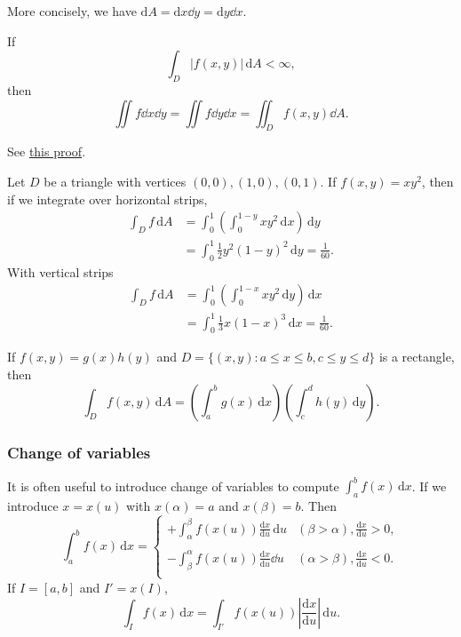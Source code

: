 More concisely, we have $ \mathrm{d} A = \mathrm{d} x\dd y=\mathrm{d} y\dd x $.
\begin{theorem}\label{thm:Fubini's theorem}
    If
    \[
        \int_{D} \left| f(x,y) \right| \,\mathrm{d}A<\infty,
    \]
    then 
    \[
        \iint f\dd x\dd y = \iint f\dd y\dd x = \iint_{D}f(x,y)\dd A.
    \]
\end{theorem}
See \href{https://dec41.user.srcf.net/notes/II_M/probability_and_measure.pdf\#page=50}{this proof}.

\begin{example}
    Let $D$ be a triangle with vertices $(0,0),(1,0),(0,1)$. If $f(x,y)=xy^2$, then if we integrate over horizontal strips,
    \begin{align*}
        \int_{D} f \,\mathrm{d}A &= \int_{0}^{1} \left( \int_{0}^{1-y} xy^2 \,\mathrm{d}x \right) \,\mathrm{d}y\\ 
        &= \int_{0}^{1} \frac{1}{2}y^2(1-y)^2 \,\mathrm{d}y = \frac{1}{60}.
    \end{align*}
    With vertical strips 
    \begin{align*}
        \int_{D} f \,\mathrm{d}A &= \int_{0}^{1} \left( \int_{0}^{1-x} xy^2 \,\mathrm{d}y \right) \,\mathrm{d}x\\ 
        &= \int_{0}^{1} \frac{1}{3}x(1-x)^3 \,\mathrm{d}x = \frac{1}{60}.
    \end{align*}
\end{example}

\begin{proposition}
    If $f(x,y)=g(x)h(y)$ and $ D=\{(x,y):a\le x\le b,c\le y\le d\} $ is a rectangle, then 
    \[
        \int_{D} f(x,y) \,\mathrm{d}A = \left( \int_{a}^{b} g(x) \,\mathrm{d}x \right) \left( \int_{c}^{d} h(y) \,\mathrm{d}y \right).
    \]
\end{proposition}

\subsubsection*{Change of variables}

It is often useful to introduce change of variables to compute $ \int_{a}^{b} f(x) \,\mathrm{d}x $. If we introduce $ x=x(u) $ with $ x(\alpha)=a $ and $ x(\beta)=b $. Then 
\[
    \int_{a}^{b} f(x) \,\mathrm{d}x = \begin{cases}
    \displaystyle+\int_{\alpha}^{\beta} f(x(u))\frac{\mathrm{d}x}{\mathrm{d}u}  \,\mathrm{d}u &\displaystyle(\beta>\alpha),\frac{\mathrm{d}x}{\mathrm{d}u}>0, \\
    \\
    \displaystyle-\int_{\beta}^{\alpha} f(x(u))\frac{\mathrm{d}x}{\mathrm{d}u}\dd u &\displaystyle(\alpha>\beta),\frac{\mathrm{d}x}{\mathrm{d}u}<0. \\
    \end{cases} 
\]
If $I=[a,b]$ and $I'=x(I)$,
\[
    \int_{I} f(x) \,\mathrm{d}x = \int_{I'} f(x(u)) \left| \frac{\mathrm{d}x}{\mathrm{d}u}  \right|  \,\mathrm{d}u.
\]

